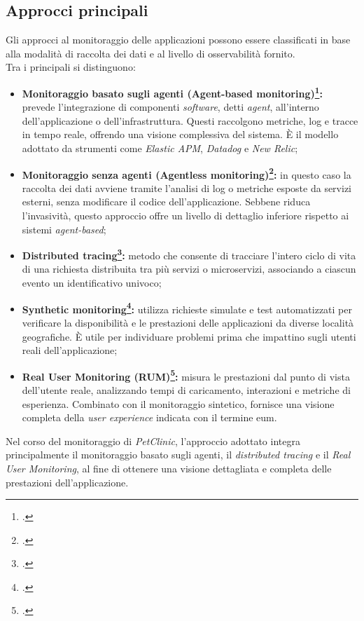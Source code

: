 \subsection{Approcci principali}
Gli approcci al monitoraggio delle applicazioni possono essere classificati in base alla modalità di raccolta dei dati e al livello di osservabilità fornito. \\
Tra i principali si distinguono:
\begin{itemize}
\item \textbf{Monitoraggio basato sugli agenti (Agent-based monitoring)\footcite{article:agent-based-monitoring}:} prevede l'integrazione di componenti \emph{software}, detti \emph{agent}, all'interno dell'applicazione o dell'infrastruttura. Questi raccolgono metriche, log e tracce in tempo reale, offrendo una visione complessiva del sistema. È il modello adottato da strumenti come \emph{Elastic APM}, \emph{Datadog} e \emph{New Relic};

\item \textbf{Monitoraggio senza agenti (Agentless monitoring)\footcite{article:agentless-monitoring}:} in questo caso la raccolta dei dati avviene tramite l'analisi di log o metriche esposte da servizi esterni, senza modificare il codice dell'applicazione. Sebbene riduca l'invasività, questo approccio offre un livello di dettaglio inferiore rispetto ai sistemi \emph{agent-based};

\item \textbf{Distributed tracing\footcite{article:distributed-tracing}:} metodo che consente di tracciare l'intero ciclo di vita di una richiesta distribuita tra più servizi o microservizi, associando a ciascun evento un identificativo univoco;

\item \textbf{Synthetic monitoring\footcite{article:synthetic-monitoring}:} utilizza richieste simulate e test automatizzati per verificare la disponibilità e le prestazioni delle applicazioni da diverse località geografiche. È utile per individuare problemi prima che impattino sugli utenti reali dell'applicazione;

\item \textbf{Real User Monitoring (RUM)\footcite{article:real-user-monitoring}:} misura le prestazioni dal punto di vista dell'utente reale, analizzando tempi di caricamento, interazioni e metriche di esperienza. Combinato con il monitoraggio sintetico, fornisce una visione completa della \emph{user experience} indicata con il termine \gls{eum}\glsfirstoccur.
\end{itemize}
Nel corso del monitoraggio di \emph{PetClinic}, l'approccio adottato integra principalmente il monitoraggio basato sugli agenti, il \emph{distributed tracing} e il \emph{Real User Monitoring}, al fine di ottenere una visione dettagliata e completa delle prestazioni dell'applicazione.


